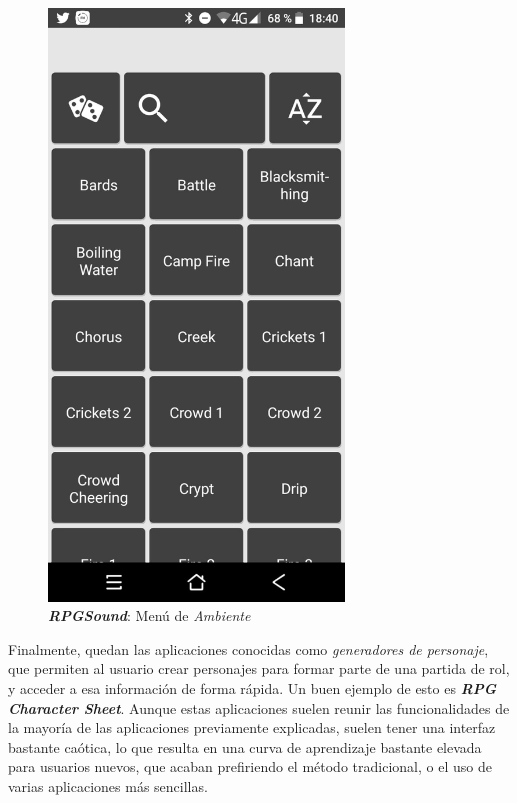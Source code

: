 \begin{figure}[H]
\begin{minipage}{0.3\textwidth}
    \end{minipage} \hspace{2cm}
    \begin{minipage}{0.3\textwidth}
        \centering
        \includegraphics[width=0.7\textwidth]{Images/RPGSound_2.jpeg}
        \caption{\textit{\textbf{RPGSound}}: Menú de \textit{Ambiente}}
        
    \end{minipage}
\end{figure}
\vspace{1cm}

\newpage
Finalmente, quedan las aplicaciones conocidas como \textit{generadores de
personaje}, que permiten al usuario crear personajes para formar parte de 
una partida de rol, y acceder a esa información de forma rápida. Un buen 
ejemplo de esto es \textit{\textbf{RPG Character Sheet}}. Aunque estas aplicaciones 
suelen reunir las funcionalidades de la mayoría de las aplicaciones previamente 
explicadas, suelen tener una interfaz bastante caótica, lo que resulta en una 
curva de aprendizaje bastante elevada para usuarios nuevos, que acaban 
prefiriendo el método tradicional, o el uso de varias aplicaciones más sencillas.\vspace{1cm}

